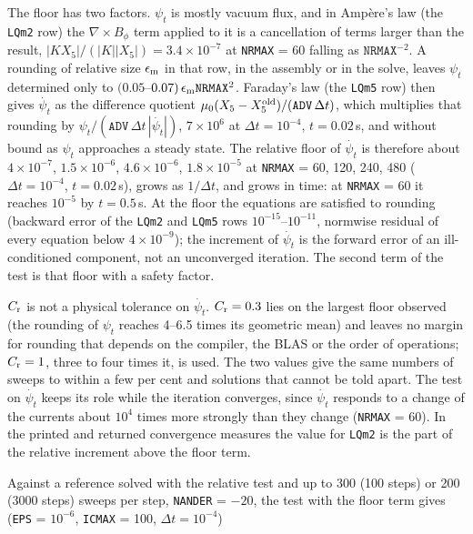 \documentclass[11pt]{article}
\def\r#1{{\rm#1}}
\def\psit{\psi_t}
\def\psitd{\dot{\psit}}
\begin{document}
The floor has two factors.  $\psit$ is mostly vacuum flux, and in Amp\`ere's
law (the \texttt{LQm2} row) the $\nabla\times B_\phi$ term applied to it is a
cancellation of terms larger than the result, $|KX_5|/(|K||X_5|) = 3.4\times10^{-7}$
at \texttt{NRMAX} = 60 falling as $\texttt{NRMAX}^{-2}$.  A rounding of relative
size $\epsilon_\r{m}$ in that row, in the assembly or in the solve, leaves $\psit$
determined only to $(0.05$--$0.07)\,\epsilon_\r{m}\texttt{NRMAX}^2$.  Faraday's
law (the \texttt{LQm5} row) then gives $\psitd$ as the difference quotient
$\mu_0(X_5 - X_5^\r{old})/(\texttt{ADV}\,\Delta t)$, which multiplies that rounding
by $\psit/(\texttt{ADV}\,\Delta t\,|\psitd|)$, $7\times10^6$ at $\Delta t = 10^{-4}$,
$t = 0.02$\,s, and without bound as $\psit$ approaches a steady state.  The
relative floor of $\psitd$ is therefore about $4\times10^{-7}$, $1.5\times10^{-6}$,
$4.6\times10^{-6}$, $1.8\times10^{-5}$ at \texttt{NRMAX} = 60, 120, 240, 480
($\Delta t = 10^{-4}$, $t = 0.02$\,s), grows as $1/\Delta t$, and grows in time:
at \texttt{NRMAX} = 60 it reaches $10^{-5}$ by $t = 0.5$\,s.  At the floor the
equations are satisfied to rounding (backward error of the \texttt{LQm2} and
\texttt{LQm5} rows $10^{-15}$--$10^{-11}$, normwise residual of every equation below
$4\times10^{-9}$); the increment of $\psitd$ is the forward error of an
ill-conditioned component, not an unconverged iteration.  The second term of the
test is that floor with a safety factor.

$C_\r{r}$ is not a physical tolerance on $\psitd$.  $C_\r{r} = 0.3$ lies on the
largest floor observed (the rounding of $\psit$ reaches 4--6.5 times its geometric
mean) and leaves no margin for rounding that depends on the compiler, the BLAS or
the order of operations; $C_\r{r} = 1$, three to four times it, is used.  The two
values give the same numbers of sweeps to within a few per cent and solutions
that cannot be told apart.  The test on $\psitd$ keeps its role while the
iteration converges, since $\psitd$ responds to a change of the currents about
$10^4$ times more strongly than they change (\texttt{NRMAX} = 60).  In the printed and returned
convergence measures the value for \texttt{LQm2} is the part of the relative
increment above the floor term.

Against a reference solved with the relative test and up to 300 (100 steps) or
200 (3000 steps) sweeps per step, \texttt{NANDER} = $-20$, the test with the floor
term gives (\texttt{EPS} = $10^{-6}$, \texttt{ICMAX} = 100, $\Delta t = 10^{-4}$)
\end{document}
